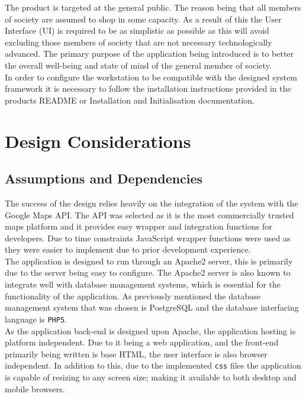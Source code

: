 \documentclass[10pt, a4paper, onecolumn]{scrartcl}
\begin{document}
		The product is targeted at the general public. The reason being that all members of society are assumed to shop in some capacity. As a result of this the User Interface (UI) is required to be as simplistic as possible as this will avoid excluding those members of society that are not necessary technologically advanced. The primary purpose of the application being introduced is to better the overall well-being and state of mind of the general member of society. \\
		
		In order to configure the workstation to be compatible with the designed system framework it is necessary to follow the installation instructions provided in the products README or Installation and Initialisation documentation.
		
	\section{Design Considerations}
	
		\subsection{Assumptions and Dependencies}
		
			The success of the design relies heavily on the integration of the system with the Google Maps API. The API was selected as it is the most commercially trusted maps platform and it provides easy wrapper and integration functions for developers. Due to time constraints JavaScript wrapper functions were used as they were easier to implement due to prior development experience. \\
			
			The application is designed to run through an Apache2 server, this is primarily due to the server being easy to configure. The Apache2 server is also known to integrate well with database management systems, which is essential for the functionality of the application. As previously mentioned the database management system that was chosen is PostgreSQL and the database interfacing language is \texttt{PHP5}. \\
			
			As the application back-end is designed upon Apache, the application hosting is platform independent. Due to it being a web application, and the front-end primarily being written is base HTML, the user interface is also browser independent. In addition to this, due to the implemented \texttt{css} files the application is capable of resizing to any screen size; making it available to both desktop and mobile browsers. \\
			
\end{document}
